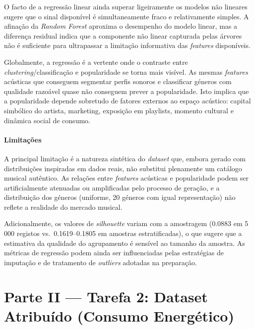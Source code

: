 \documentclass[11pt,a4paper]{article}
\begin{document}
O facto de a regressão linear ainda superar ligeiramente os modelos não lineares sugere que o sinal disponível é simultaneamente fraco e relativamente simples. A afinação da \textit{Random Forest} aproxima o desempenho do modelo linear, mas a diferença residual indica que a componente não linear capturada pelas árvores não é suficiente para ultrapassar a limitação informativa das \textit{features} disponíveis.

Globalmente, a regressão é a vertente onde o contraste entre \textit{clustering}/classificação e popularidade se torna mais visível. As mesmas \textit{features} acústicas que conseguem segmentar perfis sonoros e classificar géneros com qualidade razoável quase não conseguem prever a popularidade. Isto implica que a popularidade depende sobretudo de fatores externos ao espaço acústico: capital simbólico do artista, marketing, exposição em playlists, momento cultural e dinâmica social de consumo.

\subsection{Limitações}

A principal limitação é a natureza sintética do \textit{dataset} que, embora gerado com distribuições inspiradas em dados reais, não substitui plenamente um catálogo musical autêntico. As relações entre \textit{features} acústicas e popularidade podem ser artificialmente atenuadas ou amplificadas pelo processo de geração, e a distribuição dos géneros (uniforme, 20 géneros com igual representação) não reflete a realidade do mercado musical.

Adicionalmente, os valores de \textit{silhouette} variam com a amostragem (0.0883 em 5\,000 registos vs.\ 0.1619--0.1805 em amostras estratificadas), o que sugere que a estimativa da qualidade do agrupamento é sensível ao tamanho da amostra. As métricas de regressão podem ainda ser influenciadas pelas estratégias de imputação e de tratamento de \textit{outliers} adotadas na preparação.

\clearpage

\part*{Parte II --- Tarefa 2: Dataset Atribuído (Consumo Energético)}
\end{document}
